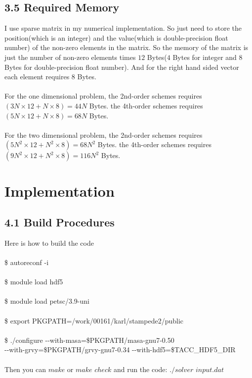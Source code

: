 \documentclass{article}
\begin{document}
\subsection*{3.5 Required Memory}
I use sparse matrix in my numerical implementation. So just need to store the position(which is an integer) and the value(which is double-precision float number) of the non-zero elements in the matrix. So the memory of the matrix is just the number of non-zero elements times $12$ Bytes($4$ Bytes for integer and $8$ Bytes for double-precision float number). And for the right hand sided vector each element requires $8$ Bytes.\\ \\
For the one dimensional problem, the 2nd-order schemes requires $(3N\times12 + N\times8) = 44N$ Bytes. the 4th-order schemes requires $(5N\times12 + N\times8) = 68N$ Bytes.\\ \\
For the two dimensional problem, the 2nd-order schemes requires $(5N^2\times12 + N^2\times8) = 68N^2$ Bytes. the 4th-order schemes requires $(9N^2\times12 + N^2\times8) = 116N^2$ Bytes.

\section{Implementation}

\subsection*{4.1 Build Procedures}
Here is how to build the code\\ \\
\$ autoreconf -i\\ \\
\$ module load hdf5\\ \\
\$ module load petsc/3.9-uni\\ \\
\$ export PKGPATH=/work/00161/karl/stampede2/public\\ \\
\$ ./configure \--\--with-masa=\$PKGPATH/masa-gnu7-0.50 \\
\--\--with-grvy=\$PKGPATH/grvy-gnu7-0.34 \--\--with-hdf5=\$TACC\_HDF5\_DIR\\ \\
Then you can $make$ or $make$ $check$ and run the code: $./solver$ $input.dat$
\end{document}
